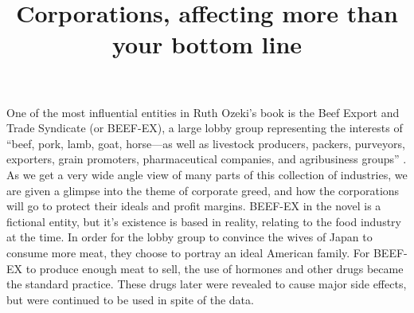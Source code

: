 \documentclass{article}
\title{Corporations, affecting more than your bottom line}
\begin{document}
\makeheader

One of the most influential entities in Ruth Ozeki's book
 is the Beef Export and Trade Syndicate (or BEEF-EX),
a large lobby group representing the interests of ``beef, pork, lamb, goat,
horse—as well as livestock producers, packers, purveyors, exporters, grain
promoters, pharmaceutical companies, and agribusiness groups''
\cite{ozeki1998my}. As we get a very wide angle view of many parts of this
collection of industries, we are given a glimpse into the theme of corporate
greed, and how the corporations will go to protect their ideals and profit
margins. BEEF-EX in the novel is a fictional entity, but it's existence is
based in reality, relating to the food industry at the time. In order for
the lobby group to convince the wives of Japan to consume more meat, they
choose to portray an ideal American family. For BEEF-EX to produce enough
meat to sell, the use of hormones and other drugs became the standard
practice. These drugs later were revealed to cause major side effects, but
were continued to be used in spite of the data. 


\end{document}
